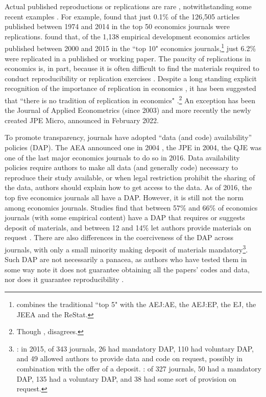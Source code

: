 \documentclass{cje} %
\theoremstyle{plain}%
\theoremstyle{definition}
\theoremstyle{remark}
\begin{document}
Actual published reproductions or replications are rare \citep{BellMiller2013b,Duvendack2017}, notwithstanding some recent examples \citep{Hoeffler2017a,Chang2017,ChangLi2015,camerer2016}. For example, \cite{MuellerLanger18} found that just 0.1\% of the 126,505 articles published between 1974 and 2014 in the top 50 economics journals were replications. \cite{sukhtankar17} found that, of the 1,138 empirical development economics articles published between 2000 and 2015 in the ``top 10" economics journals,\footnote{\cite{sukhtankar17} combines the traditional ``top 5" with the \ac{AEJ:AE}, the \ac{AEJ:EP}, the \ac{EJ}, the \ac{JEEA} and the \ac{ReStat}.} just 6.2\% were replicated in a published or working paper. The paucity of replications in economics is, in part, because it is often difficult to find the materials required to conduct reproducibility or replication exercises \citep{Dewald1986,McCullough2006,McCullough03}. Despite a long standing explicit recognition of the importance of replication in economics \citep{Frisch1933}, it has been suggested that ``there is no tradition of replication in economics" \citep[p. 1093]{McCullough2006}.\footnote{Though \cite{Hamermesh2007}, \cite{Hamermesh2017} disagrees.} An exception has been the Journal of Applied Econometrics (since 2003) and more recently the newly created \ac{JPE} Micro, announced in February 2022.

To promote transparency, journals have adopted ``data (and code) availability'' policies (DAP). The \ac{AEA} announced one in 2004 \citep{bernanke2004}, the \ac{JPE} in 2004, the \ac{QJE} was one of the last major economics journals to do so in 2016. Data availability policies require authors to make all data (and generally code) necessary to reproduce their study available, or when legal restriction prohibit the sharing of the data, authors should explain how to get access to the data. As of 2016, the top five economics journals all have a DAP. However, it is still not the norm among economics journals. Studies find that between 57\% and 66\% of economics journals (with some empirical content) have a DAP that requires or suggests deposit of materials, and between 12 and 14\% let authors provide materials on request \citep{Hoeffler2017,vlaeminck2021}. There are also differences in the coerciveness of the DAP across journals, with only a small minority making deposit of materials mandatory\footnote{\cite{Hoeffler2017}: in 2015, of 343 journals, 26 had mandatory DAP, 110 had voluntary DAP, and 49 allowed authors to provide data and code on request, possibly in combination with the offer of a deposit. \cite{vlaeminck2021}: of 327 journals, 50 had a mandatory DAP, 135 had a voluntary DAP, and 38 had some sort of provision on request.}. Such DAP are not necessarily a panacea, as authors who have tested them in some way note it does not guarantee obtaining all the papers' codes and data, nor does it guarantee reproducibility \citep{Glandon2010,Hoeffler2017,Stodden2018}.
\end{document}
